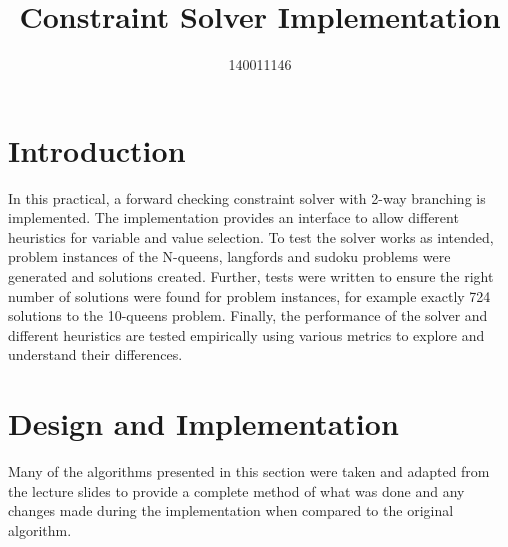\documentclass{article}
\title{Constraint Solver Implementation}
\author{140011146}
\begin{document}




\section{Introduction}
In this practical, a forward checking constraint solver with 2-way branching is implemented. The implementation provides an interface to allow different heuristics for variable and value selection. To test the solver works as intended, problem instances of the N-queens, langfords and sudoku problems were generated and solutions created. Further, tests were written to ensure the right number of solutions were found for problem instances, for example exactly 724 solutions to the 10-queens problem. Finally, the performance of the solver and different heuristics are tested empirically using various metrics to explore and understand their differences. 

\section{Design and Implementation}
Many of the algorithms presented in this section were taken and adapted from the lecture slides to provide a complete method of what was done and any changes made during the implementation when compared to the original algorithm. 
\end{document}
